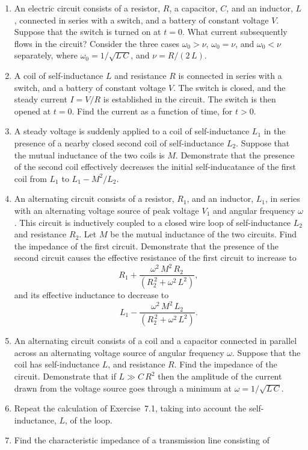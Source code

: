 {\begin{enumerate}
\item An electric circuit consists of a resistor, $R$, a capacitor, $C$, and
an inductor, $L$, connected in series with a switch, and a battery of constant voltage
$V$. Suppose that the switch is turned on at $t=0$. What current subsequently flows in the circuit? Consider the three cases $\omega_0> \nu$,
$\omega_0=\nu$, and $\omega_0< \nu$ separately, where $\omega_0=1/\sqrt{L\,C}$, and $\nu = R/(2\,L)$.
\item A coil of self-inductance $L$ and resistance $R$ is connected
in series with a switch, and  a battery of constant voltage $V$. The
switch is closed, and the steady current $I=V/R$
is established in the circuit. The switch is then opened at $t=0$. Find 
the current as a function of time, for $t >0$. 
\item A steady voltage is suddenly applied to a coil of self-inductance $L_1$ in the presence of a nearby closed second coil of self-inductance $L_2$. Suppose that the mutual inductance of the two coils is $M$. Demonstrate
that the presence of the second coil effectively decreases the initial self-inducatance of the first coil from $L_1$ to $L_1-M^2/L_2$. 
\item An alternating circuit consists of a resistor, $R_1$, and an inductor, $L_1$, in series with an alternating voltage source of peak voltage $V_1$
and angular frequency $\omega$. This circuit is inductively coupled
to a closed wire loop of self-inductance $L_2$ and resistance $R_2$. Let
$M$ be the mutual inductance of the two circuits. Find the impedance of
the first circuit. Demonstrate that the presence of the second circuit
causes the effective resistance of the first circuit to increase to
$$
R_1 + \frac{\omega^2\,M^2\,R_2}{(R_2^{\,2} + \omega^2\,L^2)},
$$
and its effective inductance to decrease to
$$
L_1 - \frac{\omega^2\,M^2\,L_2}{(R_2^{\,2} + \omega^2\,L^2)}.
$$
\item An alternating circuit consists of a coil and a capacitor connected
in parallel across an alternating voltage source of angular frequency $\omega$. Suppose that the coil has self-inductance $L$, and resistance $R$. Find
the impedance of the circuit. Demonstrate that if $L\gg C\,R^2$ then the amplitude
of the current drawn from the voltage source goes through a minimum at
$\omega=1/\sqrt{L\,C}$. 
\item Repeat the calculation of Exercise~7.1, taking into account the self-inductance, $L$, of the loop.
\item Find the characteristic impedance of a transmission line consisting of

\end{enumerate}}
